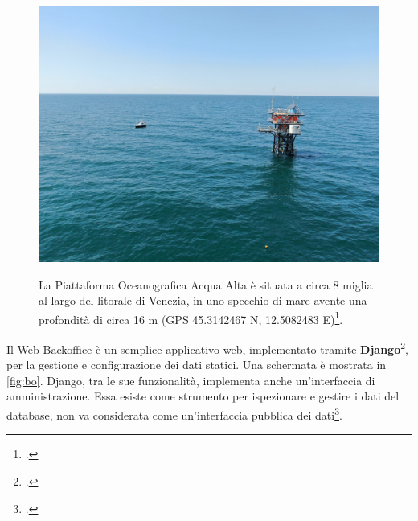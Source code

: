 \documentclass[./main.tex]{subfiles}
\begin{document}
\begin{figure}[!ht]
\noindent\begin{minipage}{0.5\textwidth}
\vspace{1cm}
\includegraphics[width=\textwidth]{images/aaot.pdf}
\captionsetup{font=small, hypcap=false}
\label{fig:aaot}
\end{minipage}
\hspace{0.05\textwidth}
\begin{minipage}{0.4\textwidth}
\begin{small}
La Piattaforma Oceanografica Acqua Alta è situata a circa 8 miglia al largo del litorale di Venezia, in uno specchio di mare avente una profondità di circa 16 m (GPS 45.3142467 N, 12.5082483 E)\footcite[\url{https://www.ismar.cnr.it/infrastrutture/infrastrutture-oceanografiche/piattaforma-acqua-alta/}]{website-ismar-cnr}.
\end{small}
\end{minipage}
\vspace{0.25cm}
\end{figure}

Il Web Backoffice è un semplice applicativo web, implementato tramite \textbf{Django}\footcite[\url{https://www.djangoproject.com/}]{website-djangoproject},  per la gestione e configurazione dei dati statici. Una schermata è mostrata in \autoref{fig:bo}.  Django, tra le sue funzionalità, implementa anche un'interfaccia di amministrazione. Essa esiste come strumento per ispezionare e gestire i dati del database, non va considerata come un'interfaccia pubblica dei dati\footcite[102-103]{the-django-book}.\par
\end{document}
